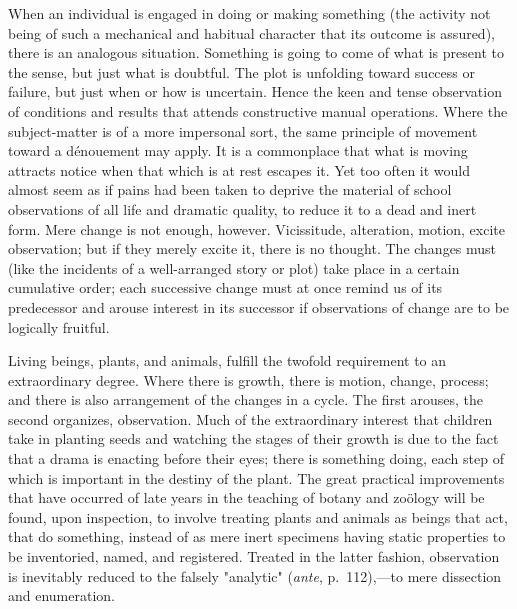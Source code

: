 \documentclass[showtrims,ustradepaper]{memoir}
\begin{document}
When an individual is engaged in doing or making something (the activity
not being of such a mechanical and habitual character that its outcome
is assured), there is an analogous situation. Something is going to come
of what is present to the sense, but just what is doubtful. The plot is
unfolding toward success or failure, but just when or how is uncertain.
Hence the keen and tense observation of conditions and results that
attends constructive manual operations. Where the subject-matter is of a
more impersonal sort, the same principle of movement toward a dénouement
may apply. It is a commonplace that what is moving attracts notice when
that which is at rest escapes it. Yet too often it would almost seem as
if pains had been taken to deprive the material of school observations
of all life and dramatic quality, to reduce it to a dead and inert form.
Mere change is not enough, however. Vicissitude, alteration, motion,
excite observation; but if they merely excite it, there is no thought.
The changes must (like the incidents of a well-arranged story or plot)
take place in a certain cumulative order; each successive change must at
once remind us of its predecessor and arouse interest in its successor
if observations of change are to be logically fruitful.


Living beings, plants, and animals, fulfill the twofold requirement to
an extraordinary degree. Where
there
is growth, there is motion, change, process; and there is also
arrangement of the changes in a cycle. The first arouses, the second
organizes, observation. Much of the extraordinary interest that children
take in planting seeds and watching the stages of their growth is due to
the fact that a drama is enacting before their eyes; there is something
doing, each step of which is important in the destiny of the plant. The
great practical improvements that have occurred of late years in the
teaching of botany and zoölogy will be found, upon inspection, to
involve treating plants and animals as beings that act, that do
something, instead of as mere inert specimens having static properties
to be inventoried, named, and registered. Treated in the latter fashion,
observation is inevitably reduced to the falsely "analytic"
(\emph{ante}, p.\ 112),---to mere dissection and enumeration.

\end{document}
